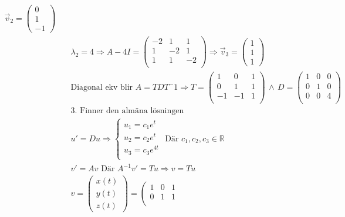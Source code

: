 \begin{align*}
  \vec{v}_2 = \begin{pmatrix} 0 \\ 1 \\ -1  \end{pmatrix} \\
  &\quad  \lambda_2 = 4 \Rightarrow{}  A -4I =
  \left(\begin{array}{ccc}
    -2 & 1 & 1 \\
    1 & -2 & 1 \\
    1 & 1 & -2 \\
  \end{array}\right) \Rightarrow{}
  \vec{v}_3 = \begin{pmatrix} 1 \\ 1 \\ 1  \end{pmatrix} \\
  &\quad  \text{Diagonal ekv blir } A=TDT^-1 \Rightarrow{} T =
  \left(\begin{array}{ccc}
    1 &  0 & 1 \\
    0 &  1 & 1 \\
    -1 & -1 & 1 \\
  \end{array}\right) \, \land{} \, D =
  \left(\begin{array}{ccc}
    1 & 0 & 0 \\
    0 & 1 & 0 \\
    0 & 0 & 4 \\
  \end{array}\right)
  &\quad  \\
  &\quad  \text{3. Finner den almäna lösningen} \\
  &\quad  u'=Du \Rightarrow{}
  \left\{\begin{array}{rrr}
  u_1 = c_1e^{t} \\
  u_2 = c_2e^{t} \\
  u_3 = c_3e^{4t} \\
  \end{array}\right. \text{ Där } c_1,c_2,c_3\in\mathbb{R} \\
  &\quad  v'=Av \text{ Där } A^{-1}v' = Tu \Rightarrow{} v=Tu \\
  &\quad  v = \begin{pmatrix} x(t) \\ y(t) \\ z(t)  \end{pmatrix} = 
  \left(\begin{array}{ccc}
    1 &  0 & 1 \\
    0 &  1 & 1 \\

\end{array}
\end{align*}
